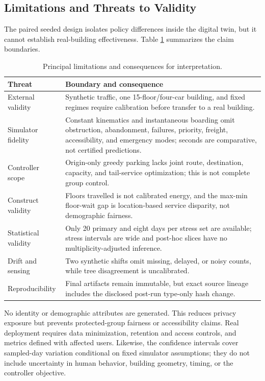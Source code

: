 \documentclass[12pt]{article}
\begin{document}
\subsection{Limitations and Threats to Validity}

The paired seeded design isolates policy differences inside the digital twin,
but it cannot establish real-building effectiveness. Table
\ref{tab:validity-threats} summarizes the claim boundaries.

\begin{table}[H]
  \centering
  \caption{Principal limitations and consequences for interpretation.}
  \label{tab:validity-threats}
  \begin{tabular}{@{}>{\raggedright\arraybackslash}p{}
    >{\raggedright\arraybackslash}p{}@{}}
    \toprule
    Threat & Boundary and consequence \\
    \midrule
    External validity & Synthetic traffic, one 15-floor/four-car building, and
      fixed regimes require calibration before transfer to a real building. \\
    Simulator fidelity & Constant kinematics and instantaneous boarding omit
      obstruction, abandonment, failures, priority, freight, accessibility,
      and emergency modes; seconds are comparative, not certified predictions. \\
    Controller scope & Origin-only greedy parking lacks joint route, destination,
      capacity, and tail-service optimization; this is not complete group control. \\
    Construct validity & Floors travelled is not calibrated energy, and the
      max-min floor-wait gap is location-based service disparity, not
      demographic fairness. \\
    Statistical validity & Only 20 primary and eight days per stress set are
      available; stress intervals are wide and post-hoc slices have no
      multiplicity-adjusted inference. \\
    Drift and sensing & Two synthetic shifts omit missing, delayed, or noisy
      counts, while tree disagreement is uncalibrated. \\
    Reproducibility & Final artifacts remain immutable, but exact source lineage
      includes the disclosed post-run type-only hash change. \\
    \bottomrule
  \end{tabular}
\end{table}

No identity or demographic attributes are generated. This reduces privacy
exposure but prevents protected-group fairness or accessibility claims. Real
deployment requires data minimization, retention and access controls, and
metrics defined with affected users. Likewise, the confidence intervals cover
sampled-day variation conditional on fixed simulator assumptions; they do not
include uncertainty in human behavior, building geometry, timing, or the
controller objective.
\end{document}
